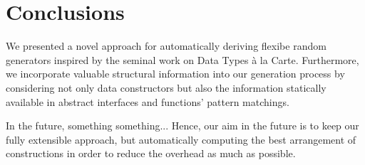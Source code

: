 \section{Conclusions}
\label{sec:conclusions}

We presented a novel approach for automatically deriving flexibe random
generators inspired by the seminal work on Data Types \`a la Carte.
%
Furthermore, we incorporate valuable structural information into our generation
process by considering not only data constructors but also the information
statically available in abstract interfaces and functions' pattern matchings.


In the future, something something...
%
Hence, our aim in the future is to keep our fully extensible approach, but
automatically computing the best arrangement of constructions in order to reduce
the overhead as much as possible.
